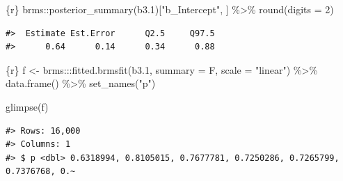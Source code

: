 \documentclass[
  letterpaper,
  DIV=11,
  numbers=noendperiod]{scrreprt}
\newenvironment{Shaded}{\begin{snugshade}}{\end{snugshade}}
\newcommand{\AttributeTok}[1]{\textcolor[rgb]{0.40,0.45,0.13}{#1}}
\newcommand{\DecValTok}[1]{\textcolor[rgb]{0.68,0.00,0.00}{#1}}
\newcommand{\FloatTok}[1]{\textcolor[rgb]{0.68,0.00,0.00}{#1}}
\newcommand{\FunctionTok}[1]{\textcolor[rgb]{0.28,0.35,0.67}{#1}}
\newcommand{\InformationTok}[1]{\textcolor[rgb]{0.37,0.37,0.37}{#1}}
\newcommand{\NormalTok}[1]{\textcolor[rgb]{0.00,0.23,0.31}{#1}}
\newcommand{\OtherTok}[1]{\textcolor[rgb]{0.00,0.23,0.31}{#1}}
\newcommand{\SpecialCharTok}[1]{\textcolor[rgb]{0.37,0.37,0.37}{#1}}
\newcommand{\StringTok}[1]{\textcolor[rgb]{0.13,0.47,0.30}{#1}}
\begin{document}
\begin{Shaded}
\begin{Highlighting}[]
\InformationTok{\textasciigrave{}\textasciigrave{}\textasciigrave{}\{r\}}
\NormalTok{brms}\SpecialCharTok{::}\FunctionTok{posterior\_summary}\NormalTok{(b3}\FloatTok{.1}\NormalTok{)[}\StringTok{"b\_Intercept"}\NormalTok{, ] }\SpecialCharTok{\%\textgreater{}\%} 
  \FunctionTok{round}\NormalTok{(}\AttributeTok{digits =} \DecValTok{2}\NormalTok{)}
\InformationTok{\textasciigrave{}\textasciigrave{}\textasciigrave{}}
\end{Highlighting}
\end{Shaded}

\begin{verbatim}
#>  Estimate Est.Error      Q2.5     Q97.5 
#>      0.64      0.14      0.34      0.88
\end{verbatim}

\begin{Shaded}
\begin{Highlighting}[]
\InformationTok{\textasciigrave{}\textasciigrave{}\textasciigrave{}\{r\}}
\NormalTok{f }\OtherTok{\textless{}{-}}
\NormalTok{  brms}\SpecialCharTok{:::}\FunctionTok{fitted.brmsfit}\NormalTok{(b3}\FloatTok{.1}\NormalTok{, }
         \AttributeTok{summary =}\NormalTok{ F,}
         \AttributeTok{scale =} \StringTok{"linear"}\NormalTok{) }\SpecialCharTok{\%\textgreater{}\%} 
  \FunctionTok{data.frame}\NormalTok{() }\SpecialCharTok{\%\textgreater{}\%} 
  \FunctionTok{set\_names}\NormalTok{(}\StringTok{"p"}\NormalTok{)}

\FunctionTok{glimpse}\NormalTok{(f)}
\InformationTok{\textasciigrave{}\textasciigrave{}\textasciigrave{}}
\end{Highlighting}
\end{Shaded}

\begin{verbatim}
#> Rows: 16,000
#> Columns: 1
#> $ p <dbl> 0.6318994, 0.8105015, 0.7677781, 0.7250286, 0.7265799, 0.7376768, 0.~
\end{verbatim}
\end{document}
